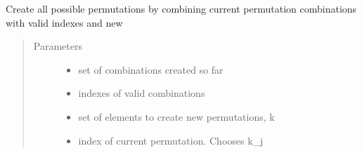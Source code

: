 \documentclass[letterpaper,12pt,english]{sphinxmanual}
\begin{document}

\begin{fulllineitems}
\label{\detokenize{functions:functions.permutations_create}}
Create all possible permutations by combining current permutation combinations with valid indexes and new
\begin{quote}\begin{description}
\item[{Parameters}] \leavevmode\begin{itemize}
\item {} 
 \textendash{} set of combinations created so far

\item {} 
 \textendash{} indexes of valid combinations

\item {} 
 \textendash{} set of elements to create new permutations, k

\item {} 
 \textendash{} index of current permutation. Chooses k\_j

\end{itemize}

\end{description}\end{quote}

\end{fulllineitems}

\end{document}

